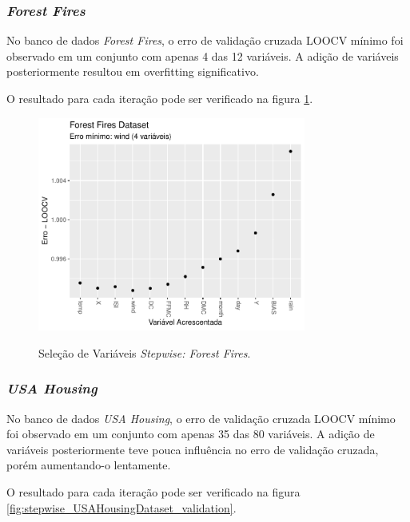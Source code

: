 \subsubsection{\textit{Forest Fires}}

No banco de dados \textit{Forest Fires}, o erro de validação cruzada LOOCV mínimo foi observado em um conjunto com apenas 4 das 12 variáveis. A adição de variáveis posteriormente resultou em overfitting significativo. 

O resultado para cada iteração pode ser verificado na figura \ref{fig:stepwise_ForestFiresDataset_validation}.

\begin{figure}[!htb]
    \centering
    \caption{Seleção de Variáveis \textit{Stepwise: Forest Fires}.}
    \includegraphics[height=200pt]{imgs/res/ForestFiresDataset_validation.pdf}
    \label{fig:stepwise_ForestFiresDataset_validation}
\end{figure}

\subsubsection{\textit{USA Housing}}

No banco de dados \textit{USA Housing}, o erro de validação cruzada LOOCV mínimo foi observado em um conjunto com apenas 35 das 80 variáveis. A adição de variáveis posteriormente teve pouca influência no erro de validação cruzada, porém aumentando-o lentamente. 

O resultado para cada iteração pode ser verificado na figura \ref{fig:stepwise_USAHousingDataset_validation}.

